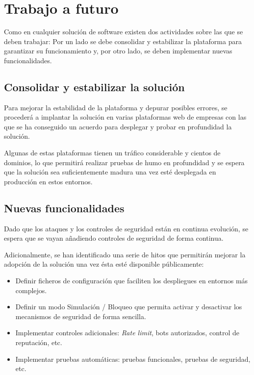 \section{Trabajo a futuro}
\par Como en cualquier solución de software existen dos actividades sobre las que se deben trabajar: Por un lado se debe consolidar y
estabilizar la plataforma para garantizar su funcionamiento y, por otro lado, se deben implementar nuevas funcionalidades.
\subsection{Consolidar y estabilizar la solución}
\par Para mejorar la estabilidad de la plataforma y depurar posibles errores, se procederá a implantar la solución en varias plataformas web
de empresas con las que se ha conseguido un acuerdo para desplegar y probar en profundidad la solución.
\par Algunas de estas plataformas tienen un tráfico considerable y cientos de dominios, lo que permitirá realizar pruebas de humo en
profundidad y se espera que la solución sea suficientemente madura una vez esté desplegada en producción en estos entornos.

\subsection{Nuevas funcionalidades}
\par Dado que los ataques y los controles de seguridad están en continua evolución, se espera que se vayan añadiendo controles de seguridad
de forma continua.
\par Adicionalmente, se han identificado una serie de hitos que permitirán mejorar la adopción de la solución una vez ésta esté disponible
públicamente:
\begin{itemize}
  \item Definir ficheros de configuración que faciliten los despliegues en entornos más complejos.
  \item Definir un modo Simulación / Bloqueo que permita activar y desactivar los mecanismos de seguridad de forma sencilla.
  \item Implementar controles adicionales: {\em Rate limit}, bots autorizados, control de reputación, etc.
  \item Implementar pruebas automáticas: pruebas funcionales, pruebas de seguridad, etc.
\end{itemize}

